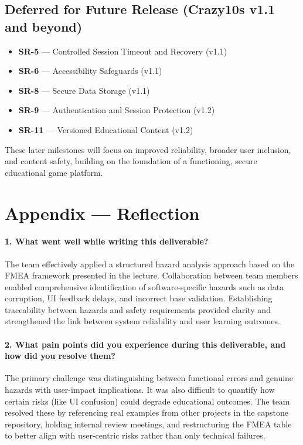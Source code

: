 \documentclass{article}
\begin{document}
\subsection{Deferred for Future Release (Crazy10s v1.1 and beyond)}

\begin{itemize}
  \item \textbf{SR-5} — Controlled Session Timeout and Recovery (v1.1)  
  \item \textbf{SR-6} — Accessibility Safeguards (v1.1)  
  \item \textbf{SR-8} — Secure Data Storage (v1.1)  
  \item \textbf{SR-9} — Authentication and Session Protection (v1.2)  
  \item \textbf{SR-11} — Versioned Educational Content (v1.2)
\end{itemize}

\noindent
These later milestones will focus on improved reliability, broader user 
inclusion, and content safety, building on the foundation of a functioning, 
secure educational game platform.

\newpage
\section*{Appendix --- Reflection}

\paragraph{1. What went well while writing this deliverable?}

The team effectively applied a structured hazard analysis approach based on 
the FMEA framework presented in the lecture. Collaboration between team members 
enabled comprehensive identification of software-specific hazards such as data 
corruption, UI feedback delays, and incorrect base validation. Establishing 
traceability between hazards and safety requirements provided clarity and 
strengthened the link between system reliability and user learning outcomes.

\paragraph{2. What pain points did you experience during this deliverable, and how did you resolve them?}

The primary challenge was distinguishing between functional errors and genuine 
hazards with user-impact implications. It was also difficult to quantify how 
certain risks (like UI confusion) could degrade educational outcomes. The team 
resolved these by referencing real examples from other projects in the capstone 
repository, holding internal review meetings, and restructuring the FMEA table 
to better align with user-centric risks rather than only technical failures.
\end{document}
